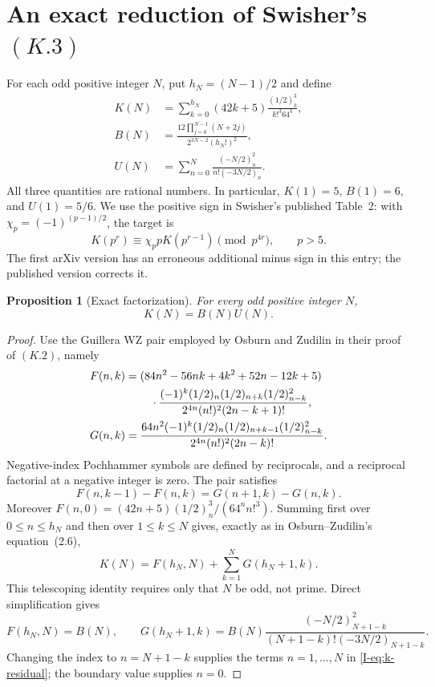 \documentclass[11pt,letterpaper]{article}
\newtheorem{proposition}[theorem]{Proposition}
\numberwithin{equation}{section}
\begin{document}
\section{An exact reduction of Swisher's \texorpdfstring{$(K.3)$}{(K.3)}}\label{loc-I-3}
\label{I-sec:k-reduction}

For each odd positive integer $N$, put $h_N=(N-1)/2$ and define
\begin{align}
 K(N)&=\sum_{k=0}^{h_N}(42k+5)
               \frac{(1/2)_k^3}{k!^3 64^k},\label{I-eq:k-sum}\\
 B(N)&=\frac{12\displaystyle\prod_{j=0}^{N-1}(N+2j)}
                {2^{3N-2}(h_N!)^2},\label{I-eq:k-prefactor}\\
 U(N)&=\sum_{n=0}^{N}
                \frac{(-N/2)_n^2}{n!(-3N/2)_n}.\label{I-eq:k-residual}
\end{align}
All three quantities are rational numbers. In particular,
$K(1)=5$, $B(1)=6$, and $U(1)=5/6$. We use the positive sign in
Swisher's published Table~2: with $\chi_p=(-1)^{(p-1)/2}$, the target is
\begin{equation}\label{I-eq:k-target}
 K(p^r)\equiv\chi_p pK(p^{r-1})\pmod{p^{4r}},\qquad p>5.
\end{equation}
The first arXiv version has an erroneous additional minus sign in this
entry; the published version corrects it.

\begin{proposition}[Exact factorization]\label{I-prop:k-factorization}
For every odd positive integer $N$,
\begin{equation}\label{I-eq:k-factorization}
 K(N)=B(N)U(N).
\end{equation}
\end{proposition}
\begin{proof}
Use the Guillera WZ pair employed by Osburn and Zudilin in their proof
of $(K.2)$, namely
\begin{align*}
 F(n,k)&=(84n^2-56nk+4k^2+52n-12k+5)\\
 &\hspace{8mm}\cdot
 \frac{(-1)^k(1/2)_n(1/2)_{n+k}(1/2)_{n-k}^{2}}
 {2^{4n}(n!)^2(2n-k+1)!},\\
 G(n,k)&=
 \frac{64n^2(-1)^k(1/2)_n(1/2)_{n+k-1}(1/2)_{n-k}^{2}}
 {2^{4n}(n!)^2(2n-k)!}.
\end{align*}
Negative-index Pochhammer symbols are defined by reciprocals, and a
reciprocal factorial at a negative integer is zero. The pair satisfies
\[
 F(n,k-1)-F(n,k)=G(n+1,k)-G(n,k).
\]
Moreover $F(n,0)=(42n+5)(1/2)_n^3/(64^n n!^3)$.
Summing first over $0\le n\le h_N$ and then over $1\le k\le N$
gives, exactly as in Osburn--Zudilin's equation~(2.6),
\[
 K(N)=F(h_N,N)+\sum_{k=1}^{N}G(h_N+1,k).
\]
This telescoping identity requires only that $N$ be odd, not prime.
Direct simplification gives
\[
 F(h_N,N)=B(N),\qquad
 G(h_N+1,k)=B(N)
 \frac{(-N/2)_{N+1-k}^{2}}
 {(N+1-k)!(-3N/2)_{N+1-k}}.
\]
Changing the index to $n=N+1-k$ supplies the terms $n=1,\ldots,N$
in \eqref{I-eq:k-residual}; the boundary value supplies $n=0$.
\end{proof}
\end{document}
